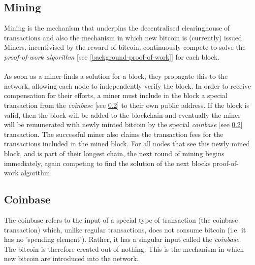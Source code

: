 \subsection{Mining}\label{background-mining}
Mining is the mechanism that underpins the decentralised clearinghouse of transactions and also the mechanism in which new bitcoin is (currently) issued. Miners, incentivised by the reward of bitcoin, continuously compete to solve the \textit{proof-of-work algorithm} [see \ref{background-proof-of-work}] for each block. 
\\\\
As soon as a miner finds a solution for a block, they propagate this to the network, allowing each node to independently verify the block. In order to receive compensation for their efforts, a miner must include in the block a special transaction from the \textit{coinbase} [see \ref{background-coinbase}] to their own public address. If the block is valid, then the block will be added to the blockchain and eventually the miner will be remunerated with newly minted bitcoin by the special \textit{coinbase} [see \ref{background-coinbase}] transaction. The successful miner also claims the transaction fees for the transactions included in the mined block. For all nodes that see this newly mined block, and is part of their longest chain, the next round of mining begins immediately, again competing to find the solution of the next blocks proof-of-work algorithm. 

\subsection{Coinbase}\label{background-coinbase}
The coinbase refers to the input of a special type of transaction (the coinbase transaction) which, unlike regular transactions, does not consume bitcoin (i.e. it has no 'spending element'). Rather, it has a singular input called the \textit{coinbase}. The bitcoin is therefore created out of nothing. This is the mechanism in which new bitcoin are introduced into the network. 

